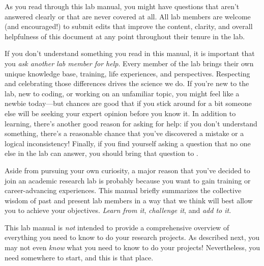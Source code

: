 \documentclass{tufte-book} %
\begin{document}
\noindent As you read through this lab manual, you might have questions that aren't answered clearly or that are never covered at all. All lab members are welcome (and encouraged!) to submit edits that improve the content, clarity, and overall helpfulness of this document at any point throughout their tenure in the lab.

\noindent{} If you don't understand something you read in this manual, it is important that you \textit{ask another lab member for help}. Every member of the lab brings their own unique knowledge base, training, life experiences, and perspectives. Respecting and celebrating those differences drives the science we do. If you're new to the lab, new to coding, or working on an unfamiliar topic, you might feel like a newbie today---but chances are good that if you stick around for a bit someone else will be seeking your expert opinion before you know it. In addition to learning, there's another good reason for asking for help: if you don't understand something, there's a reasonable chance that you've discovered a mistake or a logical inconsistency! Finally, if you find yourself asking a question that no one else in the lab can answer, you should bring that question to \director.

 Aside from pursuing your own curiosity, a major reason that you've
decided to join an academic research lab is probably because you want to gain training or career-advancing experiences. This manual briefly
summarizes the collective wisdom of past and present lab members in a way that we think will best allow you to achieve your objectives. \textit{Learn from it}, \textit{challenge it}, and \textit{add to it}.


\noindent This lab manual is \textit{not} intended to provide a comprehensive overview of everything you need to know to do your research projects. As described next, you may not even \textit{know} what you need to know to do your projects! Nevertheless, you need somewhere to start, and this is that place.
\end{document}
